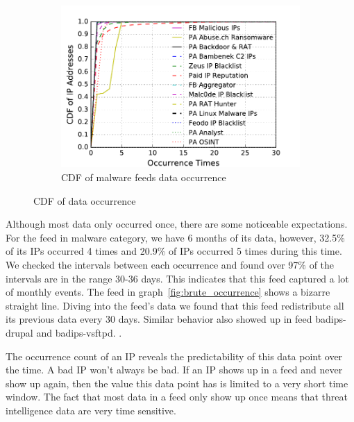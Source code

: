\begin{figure}[t!]
\begin{subfigure}{0.33\textwidth}
\includegraphics[width=\linewidth]{images/malware_occurrence.pdf}
\caption{CDF of malware feeds data occurrence}
\label{fig:malware_occurrence}
\end{subfigure}

\caption{CDF of data occurrence}
\end{figure}


Although most data only occurred once, there are some noticeable expectations. For the feed {\feedTSAbusech} in malware category, we have 6 months of its data, however, 32.5\% of its IPs occurred 4 times and 20.9\% of IPs occurred 5 times during this time. We checked the intervals between each occurrence and found over 97\% of the intervals are in the range 30-36 days. This indicates that this feed captured a lot of monthly events. The feed {\feednothink} in graph~\ref{fig:brute_occurrence} shows a bizarre straight line. Diving into the feed's data we found that this feed redistribute all its previous data every 30 days. Similar behavior also showed up in feed {badips-drupal} and {badips-vsftpd}. .

The occurrence count of an IP reveals the predictability of this data point over the time. A bad IP won't always be bad. If an IP shows up in a feed and never show up again, then the value this data point has is limited to a very short time window. The fact that most data in a feed only show up once means that threat intelligence data are very time sensitive.



